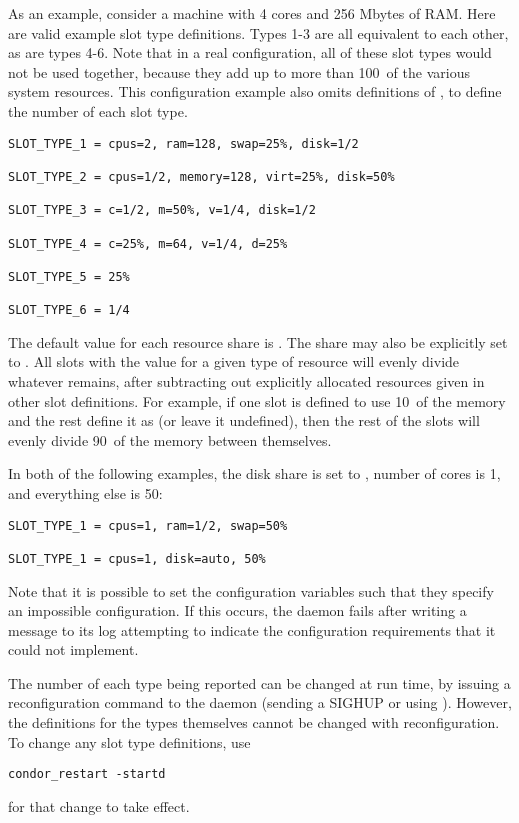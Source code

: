 \begin{description}
As an example, consider a
machine with 4 cores and 256 Mbytes of RAM.
Here are valid example slot type definitions. 
Types 1-3 are all equivalent to each other, as are types 4-6.  Note that
in a real configuration, all of these slot types would not
be used together,
because they add up to more than 100\Percent\ of the various system resources.
This configuration example also omits definitions of
, to define the number of each slot type.

\begin{verbatim}
SLOT_TYPE_1 = cpus=2, ram=128, swap=25%, disk=1/2

SLOT_TYPE_2 = cpus=1/2, memory=128, virt=25%, disk=50%

SLOT_TYPE_3 = c=1/2, m=50%, v=1/4, disk=1/2

SLOT_TYPE_4 = c=25%, m=64, v=1/4, d=25%

SLOT_TYPE_5 = 25%

SLOT_TYPE_6 = 1/4
\end{verbatim}


The default value for each resource share is .  The share
may also be explicitly set to .  All slots with the value
 for a given type of resource will evenly divide
whatever remains,
after subtracting out explicitly
allocated resources given in other slot definitions.  
For example, if one slot is
defined to use 10\Percent\ of the memory and the rest define it as
 (or leave it undefined), then the rest of the slots will
evenly divide 90\Percent\ of the memory between themselves.

In both of the following examples, the disk share is set to ,
number of cores is 1, and everything else is 50\Percent:

\begin{verbatim}
SLOT_TYPE_1 = cpus=1, ram=1/2, swap=50%

SLOT_TYPE_1 = cpus=1, disk=auto, 50%
\end{verbatim}

Note that it is possible to set the configuration variables such
that they specify an impossible configuration.
If this occurs, the  daemon fails after writing
a message to its log attempting to indicate the configuration
requirements that it could not implement.

The number of each type being
reported can be changed at run time, by issuing a reconfiguration
command to
the  daemon (sending a SIGHUP or using ).
However, the definitions for the types themselves cannot be changed
with reconfiguration.
To change any slot type definitions, use 
\begin{verbatim}
condor_restart -startd
\end{verbatim}
for that change to take effect.

\end{description}

